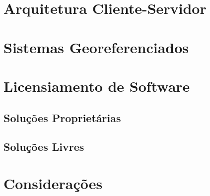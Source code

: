 \section{Arquitetura Cliente-Servidor}

\section{Sistemas Georeferenciados}

\section{Licensiamento de Software}

\subsection{Soluções Proprietárias}

\subsection{Soluções Livres}

\section{Considerações}


